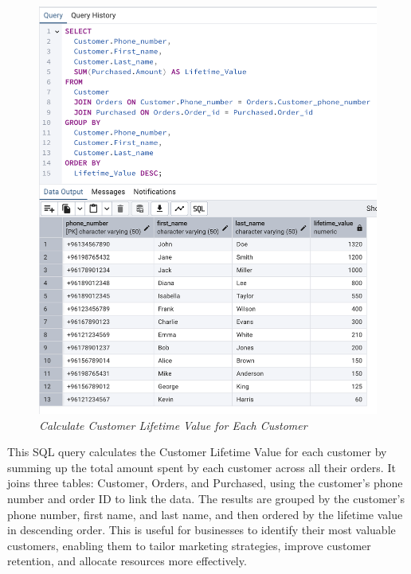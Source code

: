 


\begin{figure}[H]
  \centering
  \includegraphics[width=1\textwidth]{images/sql/complex-queries/calculate_customer_lifetime_value.png}
  \caption{\textit{Calculate Customer Lifetime Value for Each Customer}}
\end{figure}

This SQL query calculates the Customer Lifetime Value for each customer by summing up the total amount spent by each customer across all their orders. It joins three tables: Customer, Orders, and Purchased, using the customer's phone number and order ID to link the data. The results are grouped by the customer's phone number, first name, and last name, and then ordered by the lifetime value in descending order. This is useful for businesses to identify their most valuable customers, enabling them to tailor marketing strategies, improve customer retention, and allocate resources more effectively.

